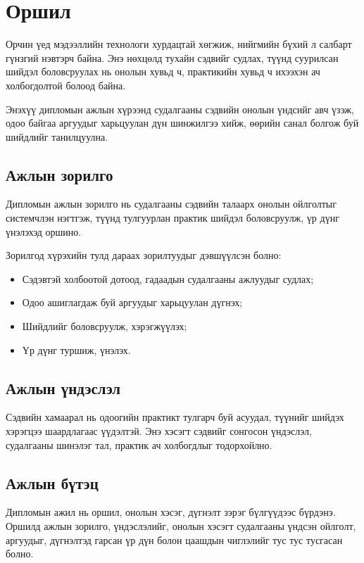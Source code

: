 \chapter{Оршил}

Орчин үед мэдээллийн технологи хурдацтай хөгжиж, нийгмийн бүхий л салбарт гүнзгий нэвтэрч байна. Энэ нөхцөлд тухайн сэдвийг судлах, түүнд суурилсан шийдэл боловсруулах нь онолын хувьд ч, практикийн хувьд ч ихээхэн ач холбогдолтой болоод байна.

Энэхүү дипломын ажлын хүрээнд судалгааны сэдвийн онолын үндсийг авч үзэж, одоо байгаа аргуудыг харьцуулан дүн шинжилгээ хийж, өөрийн санал болгож буй шийдлийг танилцуулна.

\section{Ажлын зорилго}

Дипломын ажлын зорилго нь судалгааны сэдвийн талаарх онолын ойлголтыг системчлэн нэгтгэж, түүнд тулгуурлан практик шийдэл боловсруулж, үр дүнг үнэлэхэд оршино.

Зорилгод хүрэхийн тулд дараах зорилтуудыг дэвшүүлсэн болно:
\begin{itemize}
  \item Сэдэвтэй холбоотой дотоод, гадаадын судалгааны ажлуудыг судлах;
  \item Одоо ашиглагдаж буй аргуудыг харьцуулан дүгнэх;
  \item Шийдлийг боловсруулж, хэрэгжүүлэх;
  \item Үр дүнг туршиж, үнэлэх.
\end{itemize}

\section{Ажлын үндэслэл}

Сэдвийн хамаарал нь одоогийн практикт тулгарч буй асуудал, түүнийг шийдэх хэрэгцээ шаардлагаас үүдэлтэй. Энэ хэсэгт сэдвийг сонгосон үндэслэл, судалгааны шинэлэг тал, практик ач холбогдлыг тодорхойлно.

\section{Ажлын бүтэц}

Дипломын ажил нь оршил, онолын хэсэг, дүгнэлт зэрэг бүлгүүдээс бүрдэнэ. Оршилд ажлын зорилго, үндэслэлийг, онолын хэсэгт судалгааны үндсэн ойлголт, аргуудыг, дүгнэлтэд гарсан үр дүн болон цаашдын чиглэлийг тус тус тусгасан болно.
